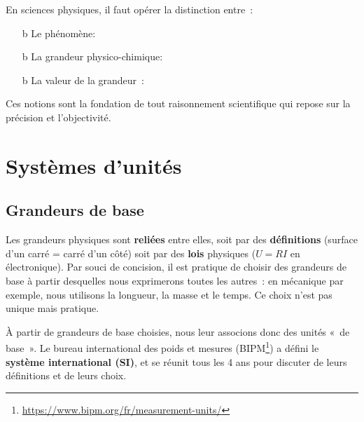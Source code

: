 \documentclass[../../main/main.tex]{subfiles}
\begin{document}
En sciences physiques, il faut opérer la distinction entre~:
\begin{enumerate}
	\item[b]{Le phénomène}: 
	\item[b]{La grandeur physico-chimique}: 
	\item[b]{La valeur} de la grandeur~: 
\end{enumerate}

Ces notions sont la fondation de tout raisonnement scientifique qui repose sur
la précision et l'objectivité.

\vspace*{\fill}

\section{Systèmes d'unités}
\subsection{Grandeurs de base}

Les grandeurs physiques sont \textbf{reliées} entre elles, soit par des
\textbf{définitions} (surface d'un carré = carré d'un côté) soit par des
\textbf{lois} physiques ($U = RI$ en électronique). Par souci de concision, il
est pratique de choisir des grandeurs de base à partir desquelles nous
exprimerons toutes les autres~: en mécanique par exemple, nous utilisons la
longueur, la masse et le temps. Ce choix n'est pas unique mais pratique.

À partir de grandeurs de base choisies, nous leur associons donc des unités «~de
base~». Le bureau international des poids et mesures
(BIPM\footnote{\href{https://www.bipm.org/fr/measurement-units/}
	{https://www.bipm.org/fr/measurement-units/}}) a défini le \textbf{système
	international (SI)}, et se réunit tous les 4 ans pour discuter de leurs
définitions et de leurs choix.
\end{document}
